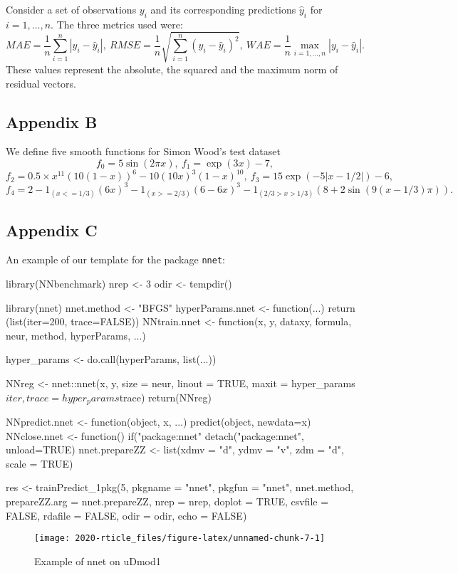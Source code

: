 Consider a set of observations \(y_i\) and its corresponding predictions
\(\hat y_i\) for \(i=1,\dots,n\). The three metrics used were: \[
MAE = \frac1n\sum_{i=1}^n|y_i - \hat y_i|,~
RMSE = \frac1n\sqrt{\sum_{i=1}^n(y_i - \hat y_i)^2},~
WAE = \frac1n\max_{i=1,\dots,n}|y_i - \hat y_i|.
\] These values represent the absolute, the squared and the maximum norm
of residual vectors.

\hypertarget{appendix-b}{%
\subsection{Appendix B}\label{appendix-b}}

We define five smooth functions for Simon Wood's test dataset \[
f_0=5\sin(2\pi x),~
f_1=\exp(3x)-7,
\] \[
f_2=0.5\times x^{11}(10(1 - x))^6 - 10 (10x)^3(1 - x)^{10},~
f_3=15 \exp(-5 |x-1/2|)-6,
\] \[
f_4=2-1_{(x <= 1/3)}(6x)^3 - 1_{(x >= 2/3)} (6-6x)^3 - 
1_{(2/3 > x > 1/3)}(8+2\sin(9(x-1/3)\pi)).
\]

\hypertarget{appendix-c}{%
\subsection{Appendix C}\label{appendix-c}}

An example of our template for the package \texttt{nnet}:

\begin{Schunk}
\begin{Sinput}
library(NNbenchmark)
nrep <- 3       
odir <- tempdir()

library(nnet)
nnet.method <- "BFGS"
hyperParams.nnet <- function(...) {
    return (list(iter=200, trace=FALSE))
}
NNtrain.nnet <- function(x, y, dataxy, formula, neur, method, hyperParams, ...) {
    
    hyper_params <- do.call(hyperParams, list(...))
    
    NNreg <- nnet::nnet(x, y, size = neur, linout = TRUE, 
                        maxit = hyper_params$iter, trace=hyper_params$trace)
    return(NNreg)
}
NNpredict.nnet  <- function(object, x, ...) { predict(object, newdata=x) }
NNclose.nnet    <- function() {  if("package:nnet" %in% search())
                                detach("package:nnet", unload=TRUE) }
nnet.prepareZZ  <- list(xdmv = "d", ydmv = "v", zdm = "d", scale = TRUE)
\end{Sinput}
\end{Schunk}

\begin{Schunk}
\begin{Sinput}
res <- trainPredict_1pkg(5, pkgname = "nnet", pkgfun = "nnet", nnet.method,
  prepareZZ.arg = nnet.prepareZZ, nrep = nrep, doplot = TRUE,
  csvfile = FALSE, rdafile = FALSE, odir = odir, echo = FALSE)
\end{Sinput}
\begin{figure}

{\centering \texttt{[image: 2020-rticle\_files/figure-latex/unnamed-chunk-7-1]} 

}

\caption[Example of nnet on uDmod1]{Example of nnet on uDmod1}\label{fig:unnamed-chunk-7}
\end{figure}
\end{Schunk}

